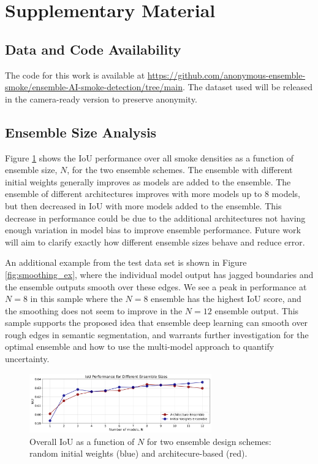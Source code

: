 \documentclass{article}
\begin{document}
\section{Supplementary Material}
\subsection{Data and Code Availability} The code for this work is available at \url{https://github.com/anonymous-ensemble-smoke/ensemble-AI-smoke-detection/tree/main}. The dataset used will be released in the camera-ready version to preserve anonymity.

\subsection{Ensemble Size Analysis} Figure \ref{fig:ensemble_size_plot} shows the IoU performance over all smoke densities as a function of ensemble size, $N$, for the two ensemble schemes. The ensemble with different initial weights generally improves as models are added to the ensemble. The ensemble of different architectures improves with more models up to 8 models, but then decreased in IoU with more models added to the ensemble. This decrease in performance could be due to the additional architectures not having enough variation in model bias to improve ensemble performance. Future work will aim to clarify exactly how different ensemble sizes behave and reduce error. 

An additional example from the test data set is shown in Figure \ref{fig:smoothing_ex}, where the individual model output has jagged boundaries and the ensemble outputs smooth over these edges. We see a peak in performance at $N=8$ in this sample where the $N=8$ ensemble has the highest IoU score, and the smoothing does not seem to improve in the $N=12$ ensemble output. This sample supports the proposed idea that ensemble deep learning can smooth over rough edges in semantic segmentation, and warrants further investigation for the optimal ensemble and how to use the multi-model approach to quantify uncertainty. 
\begin{figure}
    \centering
    \includegraphics[width=0.70\textwidth]{ensemble_size_plot.png}
    \caption{\RaggedRight Overall IoU as a function of $N$ for two ensemble design schemes: random initial weights (blue) and architecure-based (red).}
    \label{fig:ensemble_size_plot}
\end{figure}
\end{document}
